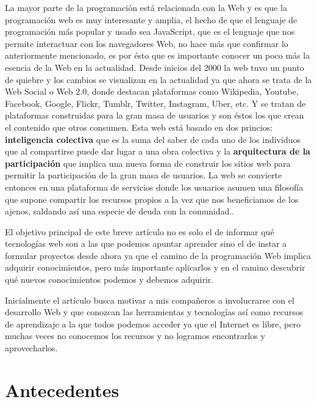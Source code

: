 \documentclass[twocolumns,a4paper]{IEEEtran}
\begin{document}
La mayor parte de la programación está relacionada con la Web y es que la
programación web es muy interesante y amplia, el hecho de que el lenguaje de
programación más popular y usado sea JavaScript, que es el lenguaje que nos
permite interactuar con los navegadores Web, no hace más que confirmar lo
anteriormente mencionado, es por ésto que es importante conocer un poco más la
esencia de la Web en la actualidad. Desde inicios del 2000 la web tuvo un punto
de quiebre y los cambios se visualizan en la actualidad ya que ahora se trata
de la Web Social o Web 2.0, donde destacan plataformas como Wikipedia, Youtube,
Facebook, Google, Flickr, Tumblr, Twitter, Instagram, Uber, etc. Y se tratan de
plataformas construidas para la gran masa de usuarios y son éstos los que crean
el contenido que otros consumen. Esta web está basado en dos princios:
\textbf{inteligencia colectiva} que es la suma del saber de cada uno de los
individuos que al compartirse puede dar lugar a una obra colectiva y la
\textbf{arquitectura de la participación} que implica una nueva forma de
construir los sitios web para permitir la participación de la gran masa de
usuarios. La web se convierte entonces en una plataforma de servicios donde los
usuarios asumen una filosofía que supone compartir los recursos propios a la
vez que nos beneficiamos de los ajenos, saldando así una especie de deuda con
la comunidad.\cite{NataliaVazquezWeb2007}.

El objetivo principal de este breve artículo no es solo el de informar qué
tecnologías web son a las que podemos apuntar aprender sino el de instar a
formular proyectos desde ahora ya que el camino de la programación Web implica
adquirir conocimientos, pero más importante aplicarlos y en el camino descubrir
qué nuevos conocimientos podemos y debemos adquirir.

Inicialmente el artículo busca motivar a mis compañeros a involucrarse con el
desarrollo Web y que conozcan las herramientas y tecnologías así como recursos
de aprendizaje a la que todos podemos acceder ya que el Internet es libre, pero
muchas veces no conocemos los recursos y no logramos encontrarlos y
aprovecharlos.

\section{Antecedentes}
\end{document}
